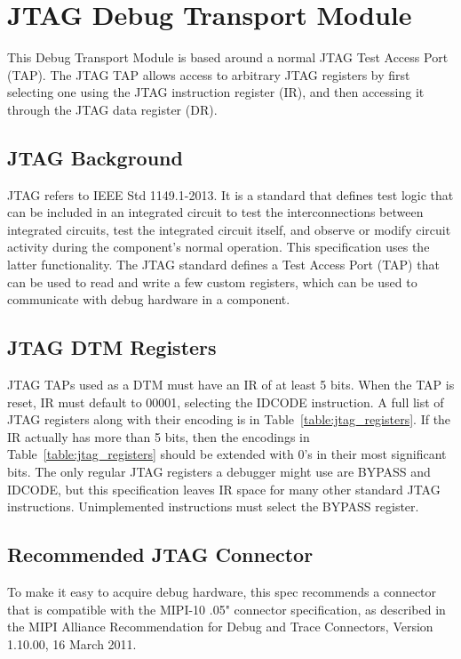 \section{JTAG Debug Transport Module} \label{sec:jtagdtm}

This Debug Transport Module is based around a normal JTAG Test Access Port
(TAP).  The JTAG TAP allows access to arbitrary JTAG registers by first
selecting one using the JTAG instruction register (IR), and then accessing it
through the JTAG data register (DR).

\subsection{JTAG Background}

JTAG refers to IEEE Std 1149.1-2013. It is a standard that defines test logic
that can be included in an integrated circuit to test the interconnections
between integrated circuits, test the integrated circuit itself, and observe or
modify circuit activity during the component’s normal operation.
This specification uses the latter functionality.
The JTAG standard defines a Test Access Port (TAP) that
can be used to read and write a few custom registers, which can be used to
communicate with debug hardware in a component.

\subsection{JTAG DTM Registers}

JTAG TAPs used as a DTM must have an IR of at least 5 bits.
When the TAP is reset, IR must default to
00001, selecting the IDCODE instruction. A full list of JTAG registers along
with their encoding is in Table~\ref{table:jtag_registers}.
If the IR actually has more than 5 bits, then the encodings in
Table~\ref{table:jtag_registers} should be extended with 0's in their
most significant bits.
The only regular JTAG registers a debugger might use are BYPASS and IDCODE, but this
specification leaves IR space for many other standard JTAG instructions.
Unimplemented instructions must select the BYPASS register.



\subsection{Recommended JTAG Connector}

To make it easy to acquire debug hardware, this spec recommends a connector
that is compatible with the MIPI-10 .05" connector specification, as described
in the MIPI Alliance Recommendation for Debug and Trace Connectors, Version
1.10.00, 16 March 2011.

